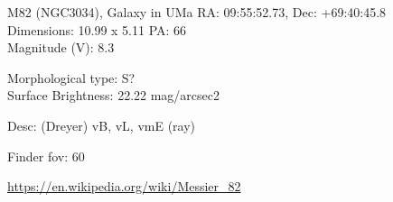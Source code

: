 \begin{block}{M82 (NGC3034), Galaxy in UMa}
    RA: 09:55:52.73, Dec: +69:40:45.8 \\ 
    Dimensions: 10.99 x 5.11 PA: 66 \\ 
    Magnitude (V): 8.3

    Morphological type: S? \\ 
    Surface Brightness: 22.22 mag/arcsec2 

    Desc: (Dreyer) vB, vL, vmE (ray) 

    Finder fov: 60 

    \url{https://en.wikipedia.org/wiki/Messier_82} 
\end{block}